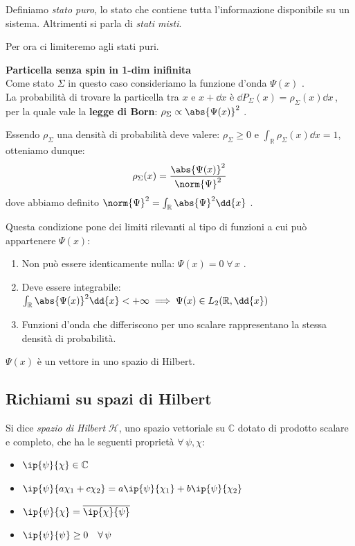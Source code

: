 \begin{definition}
    Definiamo \textit{stato puro}, lo stato che contiene tutta l'informazione disponibile su un sistema.
    Altrimenti si parla di \textit{stati misti}.
\end{definition}
Per ora ci limiteremo agli stati puri.

\begin{example}
    \textbf{Particella senza spin in 1-dim inifinita}\\
    Come stato \(\Sigma\) in questo caso consideriamo la funzione d'onda \(\Psi(x)\) . \\
    La probabilità di trovare la particella tra  \(x\)  e  \(x+\dd{x}\)  è  \(\dd{P_\Sigma}(x)= \rho_\Sigma(x)\dd{x}\,\), 
    per la quale vale la \textbf{legge di Born}: \(\rho_\Sigma\propto \abs{\Psi(x)}^2\) .

    Essendo \(\rho_\Sigma\) una densità di probabilità deve valere: \(\rho_\Sigma \geq 0 \) e \(\int_\mathbb{R} \rho_\Sigma(x) \dd{x}= 1\), otteniamo dunque:
    \begin{equation}
        \rho_\Sigma(x) = \frac{\abs{\Psi(x)}^2}{\norm{\Psi}^2} 
    \end{equation}
    dove abbiamo definito \(\norm{\Psi}^2 = \int_\mathbb{R}\abs{\Psi}^2 \dd{x}\) .

    Questa condizione pone dei limiti rilevanti al tipo di funzioni a cui può appartenere \(\Psi(x)\):
    \begin{enumerate}
        \item Non può essere identicamente nulla: \(\Psi(x)= 0 \;\forall \, x\) .
        \item Deve essere integrabile: \(\int_\mathbb{R} \abs{\Psi(x)}^2 \dd{x} < + \infty \implies \Psi(x) \in L_2(\mathbb{R}, \dd{x})\)
        \item Funzioni d'onda che differiscono per uno scalare rappresentano la stessa densità di probabilità.
    \end{enumerate}
    
    \begin{remark}
        \(\Psi(x)\) è un vettore in uno spazio di Hilbert.
    \end{remark}
\end{example}



\subsection{Richiami su spazi di Hilbert}
Si dice \textit{spazio di Hilbert} \(\mathcal{H}\), uno spazio vettoriale su \(\mathbb{C}\) dotato di prodotto scalare e completo, 
che ha le seguenti proprietà \(\forall \,\psi,\chi\):
\begin{itemize}
    \item \( \ip{\psi}{\chi} \in \mathbb{C}\)
    \item \(\ip{\psi}{a\chi_1+c\chi_2}= a\ip{\psi}{\chi_1}+b\ip{\psi}{\chi_2}\)
    \item \(\ip{\psi}{\chi}= \overline{\ip{\chi}{\psi}}\)
    \item \(\ip{\psi}{\psi}\geq 0\quad \forall \,\psi\)
\end{itemize}

